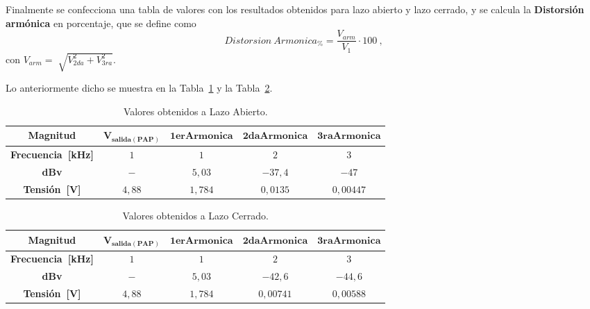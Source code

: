       Finalmente se confecciona una tabla de valores con los resultados obtenidos para lazo abierto y 
      lazo cerrado, y se calcula la 
      \textbf{Distorsión armónica} en porcentaje, que se define como 
        \begin{equation}
          Distorsion~Armonica_{\%}= \dfrac{V_{arm}}{V_{1}} \cdot 100~,
          \label{eqn:DistorsionArmonica}
        \end{equation}
      con $V_{arm}=\sqrt[]{V_{2da}^2+V_{3ra}^2}$.
      
      Lo anteriormente dicho se muestra en la 
      Tabla~\ref{tab:Exp7DistArmLA} y la Tabla~\ref{tab:Exp7DistArmLC}.

      \begin{table}[H]
      \centering
        \begin{tabular}{ccccc} \hline \hline
          \textbf{Magnitud}            &   $\mathbf{V_{salida(PAP)}}$  &  $\mathbf{1erArmonica}$  & $\mathbf{2daArmonica}$  & $\mathbf{3raArmonica}$\\ \hline
          \textbf{Frecuencia~[kHz]}    &   $1$                         &    $1$                   &   $2$                   & $3$ \\
          \textbf{dBv}                 &   $-$                         &    $5,03$                &   $-37,4$                & $-47$ \\
          \textbf{Tensión~[V]}         &   $4,88$                      &    $1,784$             &   $0,0135$              & $0,00447$\\ \hline \hline
          \end{tabular}
          \caption{Valores obtenidos a Lazo Abierto.}
          \label{tab:Exp7DistArmLA}
      \end{table}

     \begin{table}[H]
      \centering
        \begin{tabular}{ccccc} \hline \hline
          \textbf{Magnitud}            &   $\mathbf{V_{salida(PAP)}}$  &  $\mathbf{1erArmonica}$  & $\mathbf{2daArmonica}$  & $\mathbf{3raArmonica}$\\ \hline
          \textbf{Frecuencia~[kHz]}    &   $1$                         &    $1$                   &   $2$                   & $3$ \\
          \textbf{dBv}                 &   $-$                         &    $5,03$                &   $-42,6$                & $-44,6$ \\
          \textbf{Tensión~[V]}         &   $4,88$                      &    $1,784$             &   $0,00741$              & $0,00588$\\ \hline \hline
          \end{tabular}
          \caption{Valores obtenidos a Lazo Cerrado.}
          \label{tab:Exp7DistArmLC}
      \end{table}

